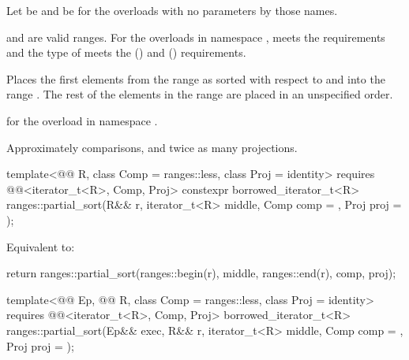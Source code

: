\begin{itemdescr}
\pnum
Let  be 
and  be 
for the overloads with no parameters by those names.

\pnum
\expects
{} and  are valid ranges.
For the overloads in namespace ,
 meets
the  requirements and
the type of  meets
the  () and
 () requirements.

\pnum
\effects
Places the first  elements
from the range 
as sorted with respect to  and 
into the range .
The rest of the elements in the range 
are placed in an unspecified order.
%

\pnum
\returns
{} for the overload in namespace .

\pnum
\complexity
Approximately  comparisons, and
twice as many projections.
\end{itemdescr}

\begin{itemdecl}
template<@@ R, class Comp = ranges::less, class Proj = identity>
  requires @@<iterator_t<R>, Comp, Proj>
  constexpr borrowed_iterator_t<R>
    ranges::partial_sort(R&& r, iterator_t<R> middle, Comp comp = {}, Proj proj = {});
\end{itemdecl}

\begin{itemdescr}
\pnum
\effects
Equivalent to:
\begin{codeblock}
return ranges::partial_sort(ranges::begin(r), middle, ranges::end(r), comp, proj);
\end{codeblock}
\end{itemdescr}

\begin{itemdecl}
template<@@ Ep, @@ R,
         class Comp = ranges::less, class Proj = identity>
  requires @@<iterator_t<R>, Comp, Proj>
  borrowed_iterator_t<R>
    ranges::partial_sort(Ep&& exec, R&& r, iterator_t<R> middle, Comp comp = {},
                         Proj proj = {});
\end{itemdecl}

